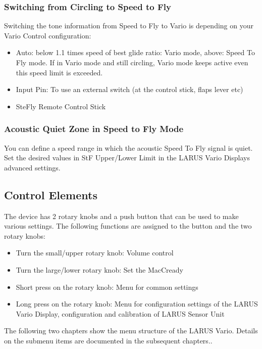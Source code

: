 \subsubsection{Switching from Circling to Speed to Fly}

Switching the tone information from Speed to Fly to Vario is depending on your Vario Control configuration:
\begin{itemize}
	\item 	Auto: below 1.1 times speed of best glide ratio: Vario mode, above: Speed To Fly mode. If in Vario mode and still circling, Vario mode keeps active even this speed limit is exceeded.
	\item 	Input Pin: To use an external switch (at the control stick, flaps lever etc)
	\item 	SteFly Remote Control Stick
\end{itemize}


\subsubsection{ Acoustic Quiet Zone in Speed to Fly Mode}

You can define a speed range in which the acoustic Speed To Fly signal is quiet.  Set the desired values in StF Upper/Lower Limit in the LARUS Vario Displays advanced settings.


\subsection{Control Elements}

The device has 2 rotary knobs and a push button that can be used to make various settings.
The following functions are assigned to the button and the two rotary knobs:
\begin{itemize}
	\item 	Turn the small/upper rotary knob: Volume control
	\item 	Turn the large/lower rotary knob: Set the MacCready
	\item 	Short press on the rotary knob: Menu for common settings
	\item 	Long press on the rotary knob: Menu for configuration settings of the 
			LARUS Vario Display, configuration and calibration of LARUS Sensor Unit
\end{itemize}

The following two chapters show the menu structure of the LARUS Vario. Details on the submenu
items are documented in the subsequent chapters..
